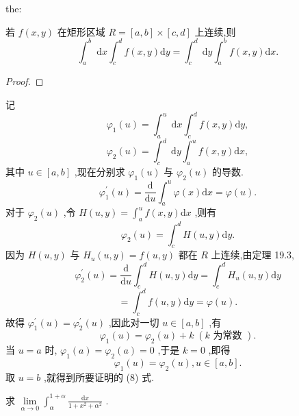 \begin{theorem}{}{the:}

\end{theorem}
 若 \(f\left( {x,y}\right)\) 在矩形区域 \(R = \left\lbrack  {a,b}\right\rbrack   \times  \left\lbrack  {c,d}\right\rbrack\) 上连续,则
\[
{\int }_{a}^{b}\mathrm{\;d}x{\int }_{c}^{d}f\left( {x,y}\right) \mathrm{d}y = {\int }_{c}^{d}\mathrm{\;d}y{\int }_{a}^{b}f\left( {x,y}\right) \mathrm{d}x. \tag{8}
\]
\begin{proof}

\end{proof}
记
\[
{\varphi }_{1}\left( u\right)  = {\int }_{a}^{u}\mathrm{\;d}x{\int }_{c}^{d}f\left( {x,y}\right) \mathrm{d}y,
\]
\[
{\varphi }_{2}\left( u\right)  = {\int }_{c}^{d}\mathrm{\;d}y{\int }_{a}^{u}f\left( {x,y}\right) \mathrm{d}x,
\]
其中 \(u \in  \left\lbrack  {a,b}\right\rbrack\) ,现在分别求 \({\varphi }_{1}\left( u\right)\) 与 \({\varphi }_{2}\left( u\right)\) 的导数.
\[
{\varphi }_{1}^{\prime }\left( u\right)  = \frac{\mathrm{d}}{\mathrm{d}u}{\int }_{a}^{u}\varphi \left( x\right) \mathrm{d}x = \varphi \left( u\right) .
\]
对于 \({\varphi }_{2}\left( u\right)\) ,令 \(H\left( {u,y}\right)  = {\int }_{a}^{u}f\left( {x,y}\right) \mathrm{d}x\) ,则有
\[
{\varphi }_{2}\left( u\right)  = {\int }_{c}^{d}H\left( {u,y}\right) \mathrm{d}y.
\]
因为 \(H\left( {u,y}\right)\) 与 \({H}_{u}\left( {u,y}\right)  = f\left( {u,y}\right)\) 都在 \(R\) 上连续,由定理 19.3,
\[
{\varphi }_{2}^{\prime }\left( u\right)  = \frac{\mathrm{d}}{\mathrm{d}u}{\int }_{c}^{d}H\left( {u,y}\right) \mathrm{d}y = {\int }_{c}^{d}{H}_{u}\left( {u,y}\right) \mathrm{d}y
\]
\[
= {\int }_{c}^{d}f\left( {u,y}\right) \mathrm{d}y = \varphi \left( u\right) .
\]
故得 \({\varphi }_{1}^{\prime }\left( u\right)  = {\varphi }_{2}^{\prime }\left( u\right)\) ,因此对一切 \(u \in  \left\lbrack  {a,b}\right\rbrack\) ,有
\[
{\varphi }_{1}\left( u\right)  = {\varphi }_{2}\left( u\right)  + k\;\left( {k\text{ 为常数 }}\right) .
\]
当 \(u = a\) 时, \({\varphi }_{1}\left( a\right)  = {\varphi }_{2}\left( a\right)  = 0\) ,于是 \(k = 0\) ,即得
\[
{\varphi }_{1}\left( u\right)  = {\varphi }_{2}\left( u\right) ,u \in  \left\lbrack  {a,b}\right\rbrack  .
\]
取 \(u = b\) ,就得到所要证明的 (8) 式.

\begin{example}

\end{example}
求 \(\mathop{\lim }\limits_{{\alpha  \rightarrow  0}}{\int }_{\alpha }^{1 + \alpha }\frac{\mathrm{d}x}{1 + {x}^{2} + {\alpha }^{2}}\) .

